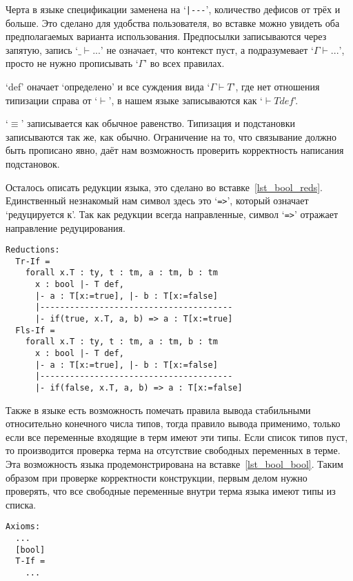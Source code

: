Черта в языке спецификации заменена на `\lstinline{|---}', количество дефисов от трёх и больше. Это сделано для удобства пользователя, во вставке можно увидеть оба предполагаемых варианта использования. Предпосылки записываются через запятую, запись `$\_ \vdash ... $' не означает, что контекст пуст, а подразумевает `$\Gamma \vdash ... $', просто не нужно прописывать `$\Gamma$' во всех правилах.

`def' оначает `определено' и все суждения вида `$\Gamma \vdash T$', где нет отношения типизации справа от `$\vdash$', в нашем языке записываются как `$ \vdash T def$'.

`$\equiv$' записывается как обычное равенство. Типизация и подстановки записываются так же, как обычно. Ограничение на то, что связывание должно быть прописано явно, даёт нам возможность проверить корректность написания подстановок.

Осталось описать редукции языка, это сделано во вставке~\ref{lst_bool_reds}. Единственный незнакомый нам символ здесь это `\lstinline{=>}', который означает `редуцируется к'. Так как редукции всегда направленные, символ `\lstinline{=>}' отражает направление редуцирования.

\begin{lstlisting}[label={lst_bool_reds}, caption={Редукции языка Bool, описанные в языке спецификации},captionpos=b, frame=single, float]
Reductions:
  Tr-If =
    forall x.T : ty, t : tm, a : tm, b : tm
      x : bool |- T def,
      |- a : T[x:=true], |- b : T[x:=false]
      |---------------------------------------
      |- if(true, x.T, a, b) => a : T[x:=true]
  Fls-If =
    forall x.T : ty, t : tm, a : tm, b : tm
      x : bool |- T def,
      |- a : T[x:=true], |- b : T[x:=false]
      |---------------------------------------
      |- if(false, x.T, a, b) => a : T[x:=false]
\end{lstlisting}

Также в языке есть возможность помечать правила вывода стабильными относительно конечного числа типов, тогда правило вывода применимо, только если все переменные входящие в терм имеют эти типы. Если список типов пуст, то производится проверка терма на отсутствие свободных переменных в терме. Эта возможность языка продемонстрирована на вставке~\ref{lst_bool_bool}. Таким образом при проверке корректности конструкции, первым делом нужно проверять, что все свободные переменные внутри терма языка имеют типы из списка.

\begin{lstlisting}[label={lst_bool_bool}, caption={Bool-стабильность правила вывода `If', описанная в языке спецификации},captionpos=b, frame=single, float]
Axioms:
  ...
  [bool]
  T-If =
    ...
\end{lstlisting}
